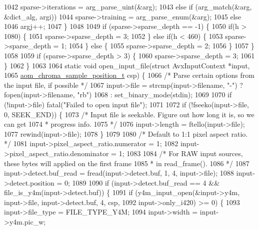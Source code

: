 \begin{DoxyCodeInclude}
{{{{{{{{{{{{{{{1042       sparse->iterations = arg\_parse\_uint(&arg);
1043     \textcolor{keywordflow}{else} \textcolor{keywordflow}{if} (arg\_match(&arg, &dict\_alg, argi))
1044       sparse->training = arg\_parse\_enum(&arg);
1045     \textcolor{keywordflow}{else}
1046       argj++;
1047   \}
1048 
1049   \textcolor{keywordflow}{if} (sparse->sparse\_depth == -1) \{
1050     \textcolor{keywordflow}{if}(h > 1080) \{
1051       sparse->sparse\_depth = 3;
1052     \} \textcolor{keywordflow}{else} \textcolor{keywordflow}{if}(h < 460) \{
1053       sparse->sparse\_depth = 1;
1054     \} \textcolor{keywordflow}{else} \{
1055       sparse->sparse\_depth = 2;
1056     \}
1057   \}
1058 
1059   \textcolor{keywordflow}{if} (sparse->sparse\_depth > 3) \{
1060     sparse->sparse\_depth = 3;
1061   \}
1062 \}
1063 
1064 \textcolor{keyword}{static} \textcolor{keywordtype}{void} open\_input\_file(\textcolor{keyword}{struct} AvxInputContext *input,
1065     \hyperlink{aom__image_8h_a48f259fc7774b1c799b3ebe7530c19bd}{aom\_chroma\_sample\_position\_t} csp) \{
1066   \textcolor{comment}{/* Parse certain options from the input file, if possible */}
1067   input->file = strcmp(input->filename, \textcolor{stringliteral}{"-"}) ? fopen(input->filename, \textcolor{stringliteral}{"rb"})
1068       : set\_binary\_mode(stdin);
1069 
1070   \textcolor{keywordflow}{if} (!input->file) fatal(\textcolor{stringliteral}{"Failed to open input file"});
1071 
1072   \textcolor{keywordflow}{if} (!fseeko(input->file, 0, SEEK\_END)) \{
1073     \textcolor{comment}{/* Input file is seekable. Figure out how long it is, so we can get}
1074 \textcolor{comment}{     * progress info.}
1075 \textcolor{comment}{     */}
1076     input->length = ftello(input->file);
1077     rewind(input->file);
1078   \}
1079 
1080   \textcolor{comment}{/* Default to 1:1 pixel aspect ratio. */}
1081   input->pixel\_aspect\_ratio.numerator = 1;
1082   input->pixel\_aspect\_ratio.denominator = 1;
1083 
1084   \textcolor{comment}{/* For RAW input sources, these bytes will applied on the first frame}
1085 \textcolor{comment}{   *  in read\_frame().}
1086 \textcolor{comment}{   */}
1087   input->detect.buf\_read = fread(input->detect.buf, 1, 4, input->file);
1088   input->detect.position = 0;
1089 
1090   \textcolor{keywordflow}{if} (input->detect.buf\_read == 4 && file\_is\_y4m(input->detect.buf)) \{
1091     \textcolor{keywordflow}{if} (y4m\_input\_open(&input->y4m, input->file, input->detect.buf, 4, csp,
1092         input->only\_i420) >= 0) \{
1093       input->file\_type = FILE\_TYPE\_Y4M;
1094       input->width = input->y4m.pic\_w;
}}}}}}}}}}}}}}}
\end{DoxyCodeInclude}
